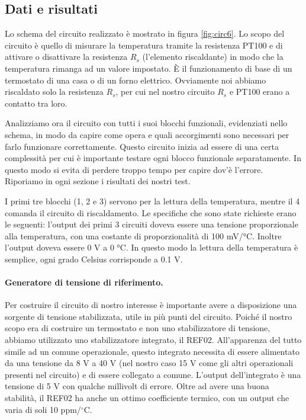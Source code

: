 \subsection{Dati e risultati}

Lo schema del circuito realizzato è mostrato in figura \ref{fig:circ6}. Lo scopo del circuito è
quello di misurare la temperatura tramite la resistenza PT100 e di attivare o disattivare
la resistenza $R_s$ (l'elemento riscaldante) in modo che la temperatura rimanga ad un valore impostato.
È il funzionamento di base di un termostato di una casa o di un forno elettrico.
Ovviamente noi abbiamo riscaldato solo la resistenza $R_s$, per cui nel nostro circuito
$R_s$ e PT100 erano a contatto tra loro. 

Analizziamo ora il circuito con tutti i suoi blocchi funzionali, evidenziati nello schema,
in modo da capire come opera e quali accorgimenti sono necessari per farlo funzionare correttamente.
Questo circuito inizia ad essere di una certa complessità per cui è importante testare ogni blocco
funzionale separatamente. In questo modo si evita di perdere troppo tempo per capire dov'è l'errore.
Riporiamo in ogni sezione i risultati dei nostri test.

I primi tre blocchi (1, 2 e 3) servono per la lettura della temperatura, mentre il 4 comanda il circuito di riscaldamento.
Le specifiche che sono state richieste erano le seguenti: l'output dei primi 3 circuiti doveva essere una tensione
proporzionale alla temperatura, con una costante di proporzionalità di 100 mV/\si{\celsius}. Inoltre
l'output doveva essere 0 V a 0 \si{\celsius}. In questo modo la lettura della temperatura è semplice,
ogni grado Celsius corrisponde a 0.1 V.

\paragraph{Generatore di tensione di riferimento.}

Per costruire il circuito di nostro interesse è importante avere a disposizione una sorgente di tensione
stabilizzata, utile in più punti del circuito. Poiché il nostro scopo era di costruire un termostato
e non uno stabilizzatore di tensione, abbiamo utilizzato uno stabilizzatore integrato, il REF02. All'apparenza del tutto
simile ad un comune operazionale, questo integrato necessita di essere alimentato da una tensione da 8 V a 40 V
(nel nostro caso 15 V come gli altri operazionali presenti nel circuito) e di essere collegato a comune. L'output
dell'integrato è una tensione di 5 V con qualche millivolt di errore. Oltre ad avere una buona stabilità, il REF02
ha anche un ottimo coefficiente termico, con un output che varia di soli 10 ppm/$^\circ$C.

